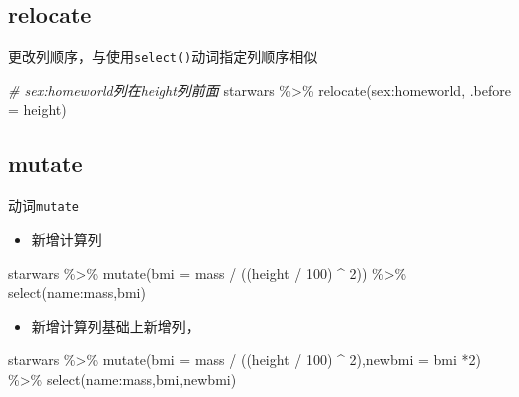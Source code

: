 \documentclass[
]{book}
\newenvironment{Shaded}{\begin{snugshade}}{\end{snugshade}}
\newcommand{\AttributeTok}[1]{\textcolor[rgb]{0.77,0.63,0.00}{#1}}
\newcommand{\CommentTok}[1]{\textcolor[rgb]{0.56,0.35,0.01}{\textit{#1}}}
\newcommand{\DecValTok}[1]{\textcolor[rgb]{0.00,0.00,0.81}{#1}}
\newcommand{\FunctionTok}[1]{\textcolor[rgb]{0.00,0.00,0.00}{#1}}
\newcommand{\NormalTok}[1]{#1}
\newcommand{\SpecialCharTok}[1]{\textcolor[rgb]{0.00,0.00,0.00}{#1}}
\providecommand{\tightlist}{%
  \setlength{\itemsep}{0pt}\setlength{\parskip}{0pt}}
\begin{document}
\hypertarget{relocate}{%
\subsection{relocate}\label{relocate}}

更改列顺序，与使用\texttt{select()}动词指定列顺序相似

\begin{Shaded}
\begin{Highlighting}[]
\CommentTok{\# sex:homeworld列在height列前面}
\NormalTok{starwars }\SpecialCharTok{\%\textgreater{}\%} \FunctionTok{relocate}\NormalTok{(sex}\SpecialCharTok{:}\NormalTok{homeworld, }\AttributeTok{.before =}\NormalTok{ height)}
\end{Highlighting}
\end{Shaded}

\hypertarget{mutate}{%
\subsection{mutate}\label{mutate}}

动词\texttt{mutate}

\begin{itemize}
\tightlist
\item
  新增计算列
\end{itemize}

\begin{Shaded}
\begin{Highlighting}[]
\NormalTok{starwars }\SpecialCharTok{\%\textgreater{}\%} 
  \FunctionTok{mutate}\NormalTok{(}\AttributeTok{bmi =}\NormalTok{ mass }\SpecialCharTok{/}\NormalTok{ ((height }\SpecialCharTok{/} \DecValTok{100}\NormalTok{)  }\SpecialCharTok{\^{}} \DecValTok{2}\NormalTok{)) }\SpecialCharTok{\%\textgreater{}\%} 
  \FunctionTok{select}\NormalTok{(name}\SpecialCharTok{:}\NormalTok{mass,bmi)}
\end{Highlighting}
\end{Shaded}

\begin{itemize}
\tightlist
\item
  新增计算列基础上新增列，
\end{itemize}

\begin{Shaded}
\begin{Highlighting}[]
\NormalTok{starwars }\SpecialCharTok{\%\textgreater{}\%} 
  \FunctionTok{mutate}\NormalTok{(}\AttributeTok{bmi =}\NormalTok{ mass }\SpecialCharTok{/}\NormalTok{ ((height }\SpecialCharTok{/} \DecValTok{100}\NormalTok{)  }\SpecialCharTok{\^{}} \DecValTok{2}\NormalTok{),}\AttributeTok{newbmi =}\NormalTok{ bmi }\SpecialCharTok{*}\DecValTok{2}\NormalTok{) }\SpecialCharTok{\%\textgreater{}\%} 
  \FunctionTok{select}\NormalTok{(name}\SpecialCharTok{:}\NormalTok{mass,bmi,newbmi)}
\end{Highlighting}
\end{Shaded}
\end{document}
